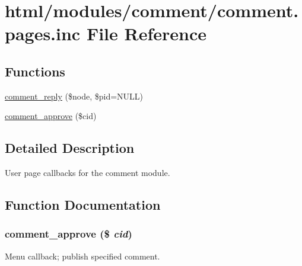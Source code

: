 \hypertarget{comment_8pages_8inc}{
\section{html/modules/comment/comment.pages.inc File Reference}
\label{comment_8pages_8inc}
}
\subsection*{Functions}
\begin{DoxyCompactItemize}
\item 
\hyperlink{comment_8pages_8inc_a1701de5fe8481441a5f48cf818aec5b1}{comment\_\-reply} (\$node, \$pid=NULL)
\item 
\hyperlink{comment_8pages_8inc_abf38af9ab16f01b36fc8f32dbfe48137}{comment\_\-approve} (\$cid)
\end{DoxyCompactItemize}


\subsection{Detailed Description}
User page callbacks for the comment module. 

\subsection{Function Documentation}
\hypertarget{comment_8pages_8inc_abf38af9ab16f01b36fc8f32dbfe48137}{
\subsubsection[{comment\_\-approve}]{\setlength{\rightskip}{0pt plus 5cm}comment\_\-approve (\$ {\em cid})}}
\label{comment_8pages_8inc_abf38af9ab16f01b36fc8f32dbfe48137}
Menu callback; publish specified comment.


